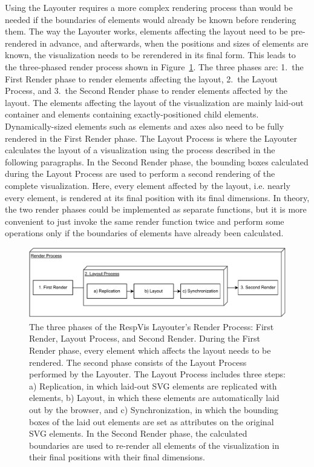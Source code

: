 Using the Layouter requires a more complex rendering process than
would be needed if the boundaries of elements would already be known
before rendering them. The way the Layouter works, elements affecting
the layout need to be pre-rendered in advance, and afterwards, when
the positions and sizes of elements are known, the visualization needs
to be rerendered in its final form. This leads to the three-phased
render process shown in Figure~\ref{fig:RenderProcess}. The three
phases are: 1.\ the First Render phase to render elements affecting
the layout, 2.\ the Layout Process, and 3.\ the Second Render phase to
render elements affected by the layout. The elements affecting the
layout of the visualization are mainly laid-out container
 and  elements containing exactly-positioned
child elements. Dynamically-sized elements such as 
elements and axes also need to be fully rendered in the First Render
phase. The Layout Process is where the Layouter calculates the layout
of a visualization using the process described in the following
paragraphs. In the Second Render phase, the bounding boxes calculated
during the Layout Process are used to perform a second rendering of
the complete visualization. Here, every element affected by the
layout, i.e. nearly every element, is rendered at its final position
with its final dimensions. In theory, the two render phases could be
implemented as separate functions, but it is more convenient to just
invoke the same render function twice and perform some operations only
if the boundaries of elements have already been calculated.


\begin{figure}[tp]
\centering
\includegraphics[keepaspectratio,width=\linewidth,height=\thirdh]
{diagrams/respvis-render-process.pdf}
\caption[Render Process When Using the Layouter]{%
The three phases of the RespVis Layouter's Render Process:
First Render, Layout Process, and Second Render.
During the First Render phase, every element which affects
the layout needs to be rendered. The second phase consists of the
Layout Process performed by the Layouter. The Layout Process includes
three steps: a) Replication, in which laid-out SVG elements are replicated with
 elements, b) Layout, in which these 
elements are automatically laid out by the browser, and
c) Synchronization, in which the bounding boxes of the laid out
 elements are set as  attributes on the
original SVG elements. In the Second Render phase, the calculated
boundaries are used to re-render all elements of the visualization in
their final positions with their final dimensions.
}
\label{fig:RenderProcess}
\end{figure}


